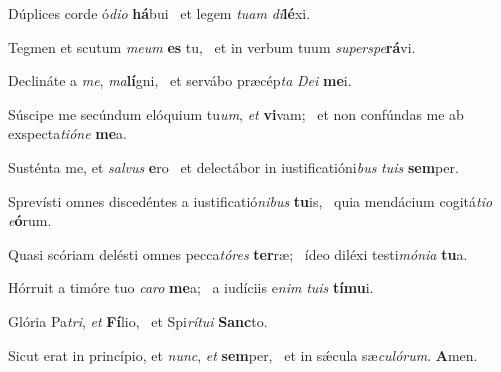 \item Dúplices corde ó\textit{dio} \textbf{há}bui~\psstar{} et legem \textit{tuam} \textit{di}\textbf{lé}xi.

\item Tegmen et scutum \textit{meum} \textbf{es} tu,~\psstar{} et in verbum tuum \textit{superspe}\textbf{rá}vi.

\item Declináte a \textit{me}, \textit{ma}\textbf{lí}gni,~\psstar{} et servábo præcép\textit{ta} \textit{Dei} \textbf{me}i.

\item Súscipe me secúndum elóquium tu\textit{um}, \textit{et} \textbf{vi}vam;~\psstar{} et non confúndas me ab exspecta\textit{tióne} \textbf{me}a.

\item Susténta me, et \textit{salvus} \textbf{e}ro~\psstar{} et delectábor in iustificatióni\textit{bus} \textit{tuis} \textbf{sem}per.

\item Sprevísti omnes discedéntes a iustificatió\textit{nibus} \textbf{tu}is,~\psstar{} quia mendácium cogitá\textit{tio} \textit{e}\textbf{ó}rum.

\item Quasi scóriam delésti omnes pecca\textit{tóres} \textbf{ter}ræ;~\psstar{} ídeo diléxi testi\textit{mónia} \textbf{tu}a.

\item Hórruit a timóre tuo \textit{caro} \textbf{me}a;~\psstar{} a iudíciis e\textit{nim} \textit{tuis} \textbf{tí}\textbf{mu}i.

\item Glória Pa\textit{tri}, \textit{et} \textbf{Fí}lio,~\psstar{} et Spi\textit{rítui} \textbf{Sanc}to.

\item Sicut erat in princípio, et \textit{nunc}, \textit{et} \textbf{sem}per,~\psstar{} et in sǽcula sæ\textit{culórum}. \textbf{A}men.
